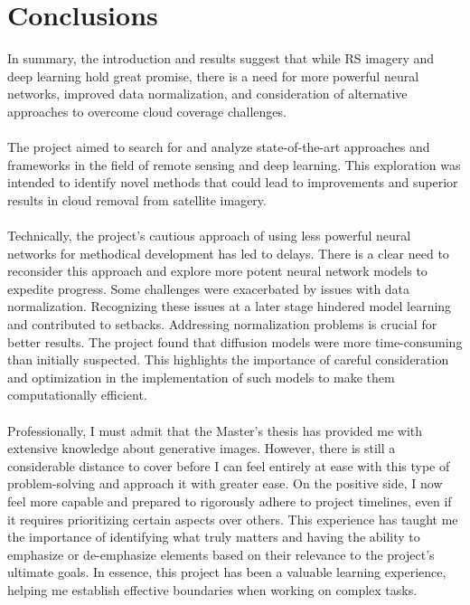 \documentclass[11pt, a4paper]{article}
\begin{document}
	
	\newpage
	\part{Conclusions}
	In summary, the introduction and results suggest that while RS imagery and deep learning hold great promise, there is a need for more powerful neural networks, improved data normalization, and consideration of alternative approaches to overcome cloud coverage challenges.
	\\
	\\
	The project aimed to search for and analyze state-of-the-art approaches and frameworks in the field of remote sensing and deep learning. This exploration was intended to identify novel methods that could lead to improvements and superior results in cloud removal from satellite imagery.
	\\
	\\
	Technically, the project's cautious approach of using less powerful neural networks for methodical development has led to delays. There is a clear need to reconsider this approach and explore more potent neural network models to expedite progress. Some challenges were exacerbated by issues with data normalization. Recognizing these issues at a later stage hindered model learning and contributed to setbacks. Addressing normalization problems is crucial for better results. The project found that diffusion models were more time-consuming than initially suspected. This highlights the importance of careful consideration and optimization in the implementation of such models to make them computationally efficient.
	\\
	\\
	Professionally, I must admit that the Master's thesis has provided me with extensive knowledge about generative images. However, there is still a considerable distance to cover before I can feel entirely at ease with this type of problem-solving and approach it with greater ease. On the positive side, I now feel more capable and prepared to rigorously adhere to project timelines, even if it requires prioritizing certain aspects over others. This experience has taught me the importance of identifying what truly matters and having the ability to emphasize or de-emphasize elements based on their relevance to the project's ultimate goals. In essence, this project has been a valuable learning experience, helping me establish effective boundaries when working on complex tasks.
	
	\newpage
	
	
	\newpage
	
	
\end{document}
